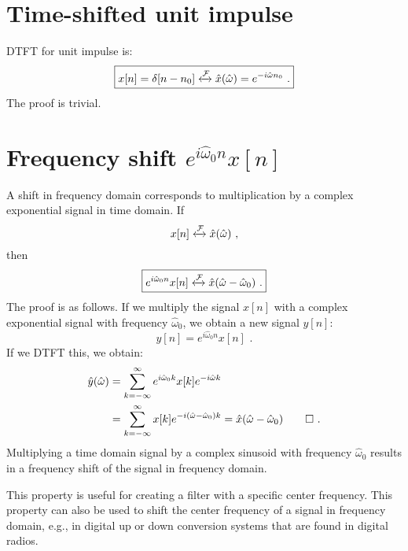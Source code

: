 \section{Time-shifted unit impulse}

DTFT for unit impulse is:
\begin{equation}
    \boxed{
        x[n] = \delta[n-n_0] \xleftrightarrow{\mathcal{F}} \hat{x}(\hat{\omega}) = e^{-i\hat{\omega}n_0}\,\,.
    }
\end{equation}
The proof is trivial.

\section{Frequency shift $e^{i\hat{\omega}_0n}x[n]$}

A shift in frequency domain corresponds to multiplication
by a complex exponential signal in time domain.  If
\begin{equation}
    x[n] \xleftrightarrow{\mathcal{F}} \hat{x}(\hat{\omega})\,\,,
\end{equation}
then
\begin{equation}
    \boxed{
    e^{i\hat{\omega}_0 n}x[n] \xleftrightarrow{\mathcal{F}} \hat{x}(\hat{\omega}-\hat{\omega}_0)\,\,.
    }
\end{equation}
The proof is as follows. If we multiply the signal $x[n]$ with a
complex exponential signal with frequency $\hat{\omega}_0$, we obtain a
new signal $y[n]$:
\begin{equation}
    y[n] = e^{i\hat{\omega}_0 n}x[n]\,\,.
\end{equation}
If we DTFT this, we obtain:
\begin{align}
    \hat{y}(\hat{\omega}) & =\sum_{k=-\infty}^{\infty} e^{i\hat{\omega}_0 k}x[k]e^{-i\hat{\omega}k}                                              \\
                          & =\sum_{k=-\infty}^{\infty} x[k] e^{-i(\hat{\omega}-\hat{\omega}_0)k} = \hat{x}(\hat{\omega}-\hat{\omega}_0)\qed\,\,.
\end{align}
Multiplying a time domain signal by a complex sinusoid with frequency
$\hat{\omega}_0$ results in a frequency shift of the signal in
frequency domain.

This property is useful for creating a filter with a specific center
frequency. This property can also be used to shift the center
frequency of a signal in frequency domain, e.g., in digital up or
down conversion systems that are found in digital radios.

